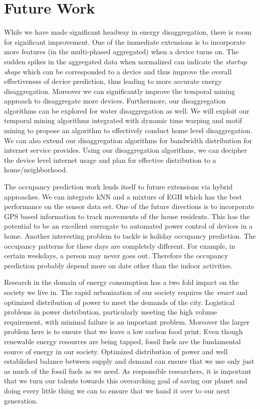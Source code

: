 \section{Future Work}
While we have made significant headway in energy disaggregation, there is room for significant improvement. One of the immediate extensions is to incorporate more features (in the multi-phased aggregated) when a device turns on. The sudden spikes in the aggregated data when normalized can indicate the \emph{startup shape} which can be corresponded to a device and thus improve the overall effectiveness of device prediction, thus leading to more accurate energy disaggregation. Moreover we can significantly improve the temporal mining approach to disaggregate more devices. Furthermore, our disaggregation algorithms can be explored for water disaggregation as well. We will exploit our temporal mining algorithms integrated with dynamic time warping and motif mining to propose an algorithm to effectively conduct home level disaggregation. We can also extend our disaggregation algorithms for bandwidth distribution for internet service provides. Using our disaggregation algorithms, we can decipher the device level internet usage and plan for effective distribution to a home/neighborhood. 

The occupancy prediction work lends itself to future extensions via hybrid approaches. We can integrate kNN and a mixture of EGH which has the best performance on the sensor data set. One of the future directions is to incorporate GPS based information to track movements of the house residents. This has the potential to be an excellent surrogate to automated power control of devices in a home. Another interesting problem to tackle is holiday occupancy prediction. The occupancy patterns for these days are completely different. For example, in certain weekdays, a person may never goes out. Therefore the occupancy prediction probably depend more on date other than the indoor activities. 

Research in the domain of energy consumption has a two fold impact on the society we live in. The rapid urbanization of our society requires the \emph{smart} and optimized distribution of power to meet the demands of the city. Logistical problems in power distribution, particularly meeting the high volume requirement, with minimal failure is an important problem. Moreover the larger problem here is to ensure that we leave a low carbon food print. Even though renewable energy resources are being tapped, fossil fuels are the fundamental source of energy in our society. Optimized distribution of power and well established balance between supply and demand can ensure that we use only just as much of the fossil fuels as we need. As responsible researchers, it is important that we turn our talents towards this overarching goal of saving our planet and doing every little thing we can to ensure that we hand it over to our next generation.
